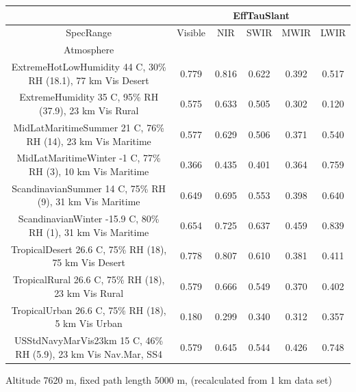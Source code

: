 \documentclass{workpackage}
\begin{document}
\begin{center}

\begin{footnotesize}

\begin{tabular}{|c|c|c|c|c|c|}
\hline
&\multicolumn{5}{|c|}{EffTauSlant}\\\hline
SpecRange&Visible&NIR&SWIR&MWIR&LWIR\\\hline
Atmosphere&&&&&\\\hline
ExtremeHotLowHumidity 44 C, 30\% RH (18.1), 77 km Vis Desert&0.779&0.816&0.622&0.392&0.517\\\hline
ExtremeHumidity 35 C, 95\% RH (37.9), 23 km Vis Rural&0.575&0.633&0.505&0.302&0.120\\\hline
MidLatMaritimeSummer 21 C, 76\% RH (14), 23 km Vis Maritime&0.577&0.629&0.506&0.371&0.540\\\hline
MidLatMaritimeWinter -1 C, 77\% RH (3), 10 km Vis Maritime&0.366&0.435&0.401&0.364&0.759\\\hline
ScandinavianSummer 14 C, 75\% RH (9), 31 km Vis Maritime&0.649&0.695&0.553&0.398&0.640\\\hline
ScandinavianWinter -15.9 C, 80\% RH (1), 31 km Vis Maritime&0.654&0.725&0.637&0.459&0.839\\\hline
TropicalDesert 26.6 C, 75\% RH (18), 75 km Vis Desert&0.778&0.807&0.610&0.381&0.411\\\hline
TropicalRural 26.6 C, 75\% RH (18), 23 km Vis Rural&0.579&0.666&0.549&0.370&0.402\\\hline
TropicalUrban 26.6 C, 75\% RH (18), 5 km Vis Urban&0.180&0.299&0.340&0.312&0.357\\\hline
USStdNavyMarVis23km 15 C, 46\% RH (5.9), 23 km Vis Nav.Mar, SS4&0.579&0.645&0.544&0.426&0.748\\\hline

\end{tabular}
\end{footnotesize}
\end{center}

Altitude 7620 m, fixed path length 5000 m, (recalculated from 1 km data set)
\end{document}
